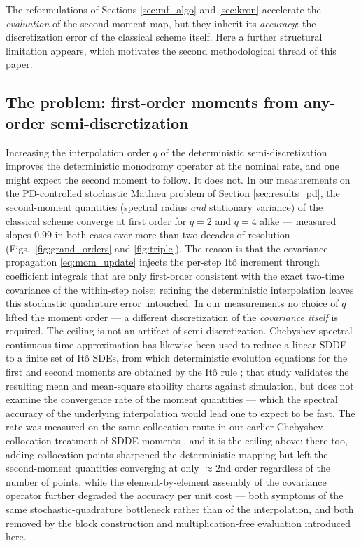 \documentclass[preprint,12pt]{elsarticle}
\begin{document}
The reformulations of Sections \ref{sec:mf_algo} and \ref{sec:kron} accelerate the \emph{evaluation} of the second-moment map, but they inherit its \emph{accuracy}: the discretization error of the classical scheme itself. Here a further structural limitation appears, which motivates the second methodological thread of this paper.

\subsection{The problem: first-order moments from any-order semi-discretization}
Increasing the interpolation order $q$ of the deterministic semi-discretization improves the deterministic monodromy operator at the nominal rate, and one might expect the second moment to follow. It does not. In our measurements on the PD-controlled stochastic Mathieu problem of Section \ref{sec:results_pd}, the second-moment quantities (spectral radius \emph{and} stationary variance) of the classical scheme converge at first order for $q=2$ and $q=4$ alike --- measured slopes $0.99$ in both cases over more than two decades of resolution (Figs.~\ref{fig:grand_orders} and \ref{fig:triple}). The reason is that the covariance propagation \eqref{eq:mom_update} injects the per-step It\^o increment through coefficient integrals that are only first-order consistent with the exact two-time covariance of the within-step noise: refining the deterministic interpolation leaves this stochastic quadrature error untouched. In our measurements no choice of $q$ lifted the moment order --- a different discretization of the \emph{covariance itself} is required. The ceiling is not an artifact of semi-discretization. Chebyshev spectral continuous time approximation has likewise been used to reduce a linear SDDE to a finite set of It\^o SDEs, from which deterministic evolution equations for the first and second moments are obtained by the It\^o rule \cite{Torkamani2014}; that study validates the resulting mean and mean-square stability charts against simulation, but does not examine the convergence rate of the moment quantities --- which the spectral accuracy of the underlying interpolation would lead one to expect to be fast. The rate was measured on the same collocation route in our earlier Chebyshev-collocation treatment of SDDE moments \cite{Fodor2023_PEM}, and it is the ceiling above: there too, adding collocation points sharpened the deterministic mapping but left the second-moment quantities converging at only $\approx 2$nd order regardless of the number of points, while the element-by-element assembly of the covariance operator further degraded the accuracy per unit cost --- both symptoms of the same stochastic-quadrature bottleneck rather than of the interpolation, and both removed by the block construction and multiplication-free evaluation introduced here.
\end{document}
